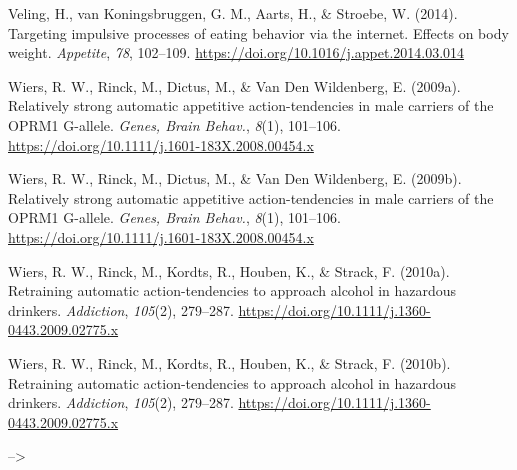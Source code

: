 \documentclass[man,floatsintext]{apa6}
\begin{document}
\hypertarget{ref-veling_targeting_2014}{}
Veling, H., van Koningsbruggen, G. M., Aarts, H., \& Stroebe, W. (2014).
Targeting impulsive processes of eating behavior via the internet.
Effects on body weight. \emph{Appetite}, \emph{78}, 102--109.
\url{https://doi.org/10.1016/j.appet.2014.03.014}

\hypertarget{ref-wiers_relatively_2009}{}
Wiers, R. W., Rinck, M., Dictus, M., \& Van Den Wildenberg, E. (2009a).
Relatively strong automatic appetitive action-tendencies in male
carriers of the OPRM1 G-allele. \emph{Genes, Brain Behav.}, \emph{8}(1),
101--106. \url{https://doi.org/10.1111/j.1601-183X.2008.00454.x}

\hypertarget{ref-wiersRelativelyStrongAutomatic2009}{}
Wiers, R. W., Rinck, M., Dictus, M., \& Van Den Wildenberg, E. (2009b).
Relatively strong automatic appetitive action-tendencies in male
carriers of the OPRM1 G-allele. \emph{Genes, Brain Behav.}, \emph{8}(1),
101--106. \url{https://doi.org/10.1111/j.1601-183X.2008.00454.x}

\hypertarget{ref-wiers_retraining_2010}{}
Wiers, R. W., Rinck, M., Kordts, R., Houben, K., \& Strack, F. (2010a).
Retraining automatic action-tendencies to approach alcohol in hazardous
drinkers. \emph{Addiction}, \emph{105}(2), 279--287.
\url{https://doi.org/10.1111/j.1360-0443.2009.02775.x}

\hypertarget{ref-wiersRetrainingAutomaticAction2010}{}
Wiers, R. W., Rinck, M., Kordts, R., Houben, K., \& Strack, F. (2010b).
Retraining automatic action-tendencies to approach alcohol in hazardous
drinkers. \emph{Addiction}, \emph{105}(2), 279--287.
\url{https://doi.org/10.1111/j.1360-0443.2009.02775.x}

\endgroup --\textgreater{}
\end{document}
